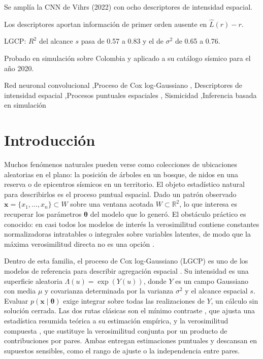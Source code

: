 \documentclass[a4paper,fleqn]{cas-sc}
\numberwithin{equation}{section}
\begin{document}
\begin{highlights}
\item Se ampl\'ia la CNN de Vihrs (2022) con ocho descriptores de intensidad espacial.
\item Los descriptores aportan informaci\'on de primer orden ausente en $\hat{L}(r)-r$.
\item LGCP: $R^2$ del alcance $s$ pasa de 0.57 a 0.83 y el de $\sigma^2$ de 0.65 a 0.76.
\item Probado en simulaci\'on sobre Colombia y aplicado a su cat\'alogo s\'ismico para el año 2020.
\end{highlights}

\begin{keywords}
Red neuronal convolucional \sep Proceso de Cox log-Gaussiano \sep
Descriptores de intensidad espacial \sep Procesos puntuales espaciales \sep
Sismicidad \sep Inferencia basada en simulaci\'on
\end{keywords}

\maketitle

\section{Introducci\'on}
\label{sec:intro}

Muchos fen\'omenos naturales pueden verse como colecciones de ubicaciones
aleatorias en el plano: la posici\'on de \'arboles en un bosque, de nidos en
una reserva o de epicentros s\'ismicos en un territorio. El objeto
estad\'istico natural para describirlos es el proceso puntual espacial.
Dado un patr\'on observado $\mathbf{x}=\{x_1,\ldots,x_n\}\subset W$ sobre
una ventana acotada $W\subset\mathbb{R}^2$, lo que interesa es recuperar
los par\'ametros $\boldsymbol{\theta}$ del modelo que lo gener\'o. El
obst\'aculo pr\'actico es conocido: en casi todos los modelos de inter\'es
la verosimilitud contiene constantes normalizadoras intratables o
integrales sobre variables latentes, de modo que la m\'axima verosimilitud
directa no es una opci\'on \citep{MollerWaagepetersen2004}.

Dentro de esta familia, el proceso de Cox log-Gaussiano (LGCP) es uno de los
modelos de referencia para describir agregaci\'on espacial \citep{Moller1998}.
Su intensidad es una superficie aleatoria $\Lambda(u)=\exp(Y(u))$, donde $Y$
es un campo Gaussiano con media $\mu$ y covarianza determinada por la
varianza $\sigma^2$ y el alcance espacial $s$. Evaluar
$p(\mathbf{x}\mid\boldsymbol{\theta})$ exige integrar sobre todas las
realizaciones de $Y$, un c\'alculo sin soluci\'on cerrada. Las dos rutas
cl\'asicas son el m\'inimo contraste \citep{mincon83, mincon84}, que ajusta
una estad\'istica resumida te\'orica a su estimaci\'on emp\'irica, y la
verosimilitud compuesta \citep{complik}, que sustituye la verosimilitud
conjunta por un producto de contribuciones por pares. Ambas entregan
estimaciones puntuales y descansan en supuestos sensibles, como el rango
de ajuste o la independencia entre pares.
\end{document}
